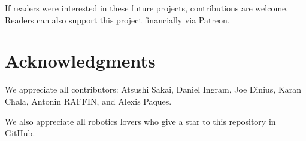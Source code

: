 \documentclass{bmvc2k}
\begin{document}
If readers were interested in these future projects, contributions are welcome.
Readers can also support this project financially via Patreon\cite{patreon}.

\section{Acknowledgments}

We appreciate all contributors: Atsushi Sakai\cite{auther6}, Daniel Ingram\cite{auther1}, Joe Dinius\cite{auther2}, Karan Chala\cite{auther3}, Antonin RAFFIN\cite{auther4}, and Alexis Paques\cite{auther6}.

We also appreciate all robotics lovers who give a star to this repository in GitHub.



\end{document}
